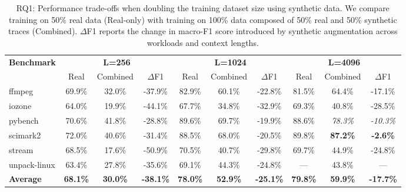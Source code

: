 \begin{table}[t]
\centering
\caption{RQ1: Performance trade-offs when doubling the training dataset size using synthetic data. We compare training on 50\% real data (Real-only) with training on 100\% data composed of 50\% real and 50\% synthetic traces (Combined). $\Delta$F1 reports the change in macro-F1 score introduced by synthetic augmentation across workloads and context lengths.}
\label{tab:rq1}
\footnotesize
\setlength{\tabcolsep}{4pt}
\begin{tabular}{@{}lccccccccc@{}}
\toprule
\multirow{2}{*}{\textbf{Benchmark}} & \multicolumn{3}{c}{\textbf{L=256}} & \multicolumn{3}{c}{\textbf{L=1024}} & \multicolumn{3}{c}{\textbf{L=4096}} \\
\cmidrule(lr){2-4} \cmidrule(lr){5-7} \cmidrule(lr){8-10}
& Real & Combined & $\Delta$F1 & Real & Combined & $\Delta$F1 & Real & Combined & $\Delta$F1 \\
\midrule
ffmpeg       & 69.9\% & 32.0\% & -37.9\% & 82.9\% & 60.1\% & -22.8\% & 81.5\% & 64.4\% & -17.1\% \\
iozone       & 64.0\% & 19.9\% & -44.1\% & 67.7\% & 34.8\% & -32.9\% & 69.3\% & 40.8\% & -28.5\% \\
pybench      & 70.6\% & 41.8\% & -28.8\% & 89.6\% & 69.7\% & -19.9\% & 88.6\% & \textit{78.3\%} & \textit{-10.3\%} \\
scimark2     & 72.0\% & 40.6\% & -31.4\% & 88.5\% & 68.0\% & -20.5\% & 89.8\% & \textbf{87.2\%} & \textbf{-2.6\%} \\
stream       & 68.5\% & 17.6\% & -50.9\% & 70.5\% & 40.7\% & -29.8\% & 69.7\% & 44.9\% & -24.8\% \\
unpack-linux & 63.4\% & 27.8\% & -35.6\% & 69.1\% & 44.3\% & -24.8\% & --- & 43.8\% & --- \\
\midrule
\textbf{Average} & \textbf{68.1\%} & \textbf{30.0\%} & \textbf{-38.1\%} & \textbf{78.0\%} & \textbf{52.9\%} & \textbf{-25.1\%} & \textbf{79.8\%} & \textbf{59.9\%} & \textbf{-17.7\%} \\
\bottomrule
\end{tabular}
\end{table}



